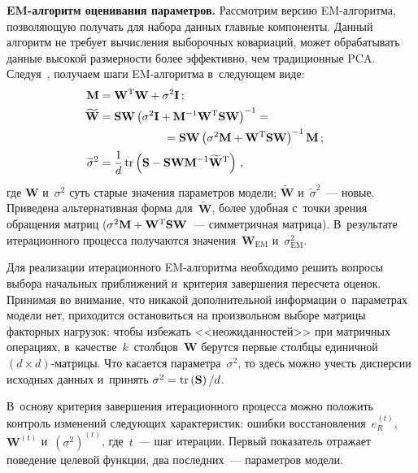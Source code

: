 \begin{multicols}{2}
     \textbf{EM-алгоритм оценивания параметров.} Рас\-смот\-рим версию  
EM-ал\-го\-рит\-ма, позволяющую получать для набора данных главные 
компоненты. Данный алгоритм не требует вычисления выборочных 
ковариаций, может обрабатывать данные высокой размерности более 
эффективно, чем традиционные PCA. Следуя~\cite{4-kri}, получаем шаги  
EM-ал\-го\-рит\-ма в~следующем виде:
     \begin{align*}
     \hspace*{-10mm}\mathbf{M} 
&=\mathbf{W}^{\mathrm{T}}\mathbf{W}+\sigma^2\mathbf{I}\,;\\
          \hspace*{-10mm}\widetilde{\mathbf{W}} &= \mathbf{S}\mathbf{W}\left(\sigma^2\mathbf{I} 
+\mathbf{M}^{-1} \mathbf{W}^{\mathrm{T}}\mathbf{SW}\right)^{-1} ={}\\
&\hspace*{20mm}{}= 
     \mathbf{SW} \left( \sigma^2 \mathbf{M}+\mathbf{W}^{\mathrm{T}} 
\mathbf{SW}\right)^{-1}\mathbf{M}\,;\\
          \hspace*{-10mm}\widetilde{\sigma}^2 &= \fr{1}{d}\,\mathrm{tr} 
          \left(\mathbf{S}-\mathbf{SWM}^{-1}
         \widetilde{\mathbf{W}}^{\mathrm{T}}\right)\,,
     \end{align*}
где $\mathbf{W}$ и~$\sigma^2$ суть старые значения параметров модели; 
$\widetilde{\mathbf{W}}$ и~$\widetilde{\sigma}^2$~--- новые. Приведена 
альтернативная форма для~$\widetilde{\mathbf{W}}$, более удобная с~точки 
зрения обращения матриц ($\sigma^2\mathbf{M}\hm+ 
\mathbf{W}^{\mathrm{T}}\mathbf{SW}$~--- симметричная матрица). 
В~результате итерационного процесса получаются 
значения~$\mathbf{W}_{\mathrm{EM}}$ и~$\sigma^2_{\mathrm{EM}}$.

     Для реализации итерационного EM-ал\-го\-рит\-ма необходимо решить 
вопросы выбора начальных приближений и~критерия завершения пересчета 
оценок. Принимая во внимание, что никакой дополнительной информации 
о~параметрах модели нет, приходится остановиться на произвольном выборе 
матрицы факторных нагрузок: чтобы избежать <<неожиданностей>> при 
матричных операциях, в~качестве~$k$~столб\-цов~$\mathbf{W}$ берутся 
первые столбцы единичной $(d\times d)$-мат\-ри\-цы. Что касается 
па\-ра\-мет\-ра~$\sigma^2$, то здесь можно учесть дисперсии исходных данных 
и~принять $\sigma^2\hm= \mathrm{tr}\left(\mathbf{S}\right)/d$. 
     
     В~основу критерия завершения итерационного процесса можно положить 
контроль изменений следующих характеристик: ошибки 
восстановления~$e_R^{(t)}$, $\mathbf{W}^{(t)}$ и~$(\sigma^2)^{(t)}$, 
где~$t$~--- шаг итерации. Первый показатель отражает поведение целевой 
функции, два последних~--- параметров модели. 
     

\end{multicols}
